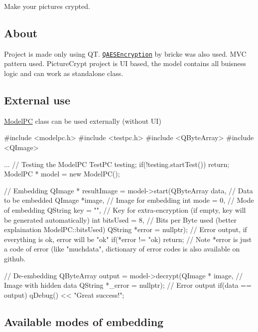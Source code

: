 Make your pictures crypted.

\subsection*{About}

Project is made only using QT. \href{http://github.com/bricke/Qt-AES}{\tt Q\+A\+E\+S\+Encryption} by bricke was also used. M\+VC pattern used. Picture\+Crypt project is UI based, the model contains all buisness logic and can work as standalone class.

\subsection*{External use}

\mbox{\hyperlink{class_model_p_c}{Model\+PC}} class can be used externally (without UI) 
\begin{DoxyCode}
#include <modelpc.h>
#include <testpc.h>
#include <QByteArray>
#include <QImage>

...
// Testing the ModelPC
TestPC testing;
if(!testing.startTest())
    return;
ModelPC * model = new ModelPC();

// Embedding
QImage * resultImage = model->start(QByteArray data, // Data to be embedded
                                    QImage *image, // Image for embedding
                                    int mode = 0, // Mode of embedding
                                    QString key = "", // Key for extra-encryption (if empty, key will be
       generated automatically)
                                    int bitsUsed = 8, // Bits per Byte used (better explaination
       ModelPC::bitsUsed)
                                    QString *error = nullptr); // Error output, if everything is ok, error
       will be "ok"
if(*error != "ok)
    return;
// Note *error is just a code of error (like "muchdata", dictionary of error codes is also available on
       github.

// De-embedding
QByteArray output = model->decrypt(QImage * image, // Image with hidden data
                                   QString *\_error = nullptr); // Error output
if(data == output)
   qDebug() << "Great success!";
\end{DoxyCode}


\subsection*{Available modes of embedding}


